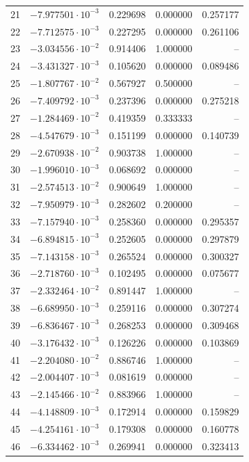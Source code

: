 \documentclass[11pt,reqno]{amsart}
\numberwithin{equation}{section}
\theoremstyle{plain}
\theoremstyle{definition}
\theoremstyle{remark}
\begin{document}
\begin{center}
\begin{longtable}{rrrrr}
21 & $-7.977501\cdot10^{-3}$ & 0.229698 & 0.000000 & 0.257177\\
22 & $-7.712575\cdot10^{-3}$ & 0.227295 & 0.000000 & 0.261106\\
23 & $-3.034556\cdot10^{-2}$ & 0.914406 & 1.000000 & --\\
24 & $-3.431327\cdot10^{-3}$ & 0.105620 & 0.000000 & 0.089486\\
25 & $-1.807767\cdot10^{-2}$ & 0.567927 & 0.500000 & --\\
26 & $-7.409792\cdot10^{-3}$ & 0.237396 & 0.000000 & 0.275218\\
27 & $-1.284469\cdot10^{-2}$ & 0.419359 & 0.333333 & --\\
28 & $-4.547679\cdot10^{-3}$ & 0.151199 & 0.000000 & 0.140739\\
29 & $-2.670938\cdot10^{-2}$ & 0.903738 & 1.000000 & --\\
30 & $-1.996010\cdot10^{-3}$ & 0.068692 & 0.000000 & --\\
31 & $-2.574513\cdot10^{-2}$ & 0.900649 & 1.000000 & --\\
32 & $-7.950979\cdot10^{-3}$ & 0.282602 & 0.200000 & --\\
33 & $-7.157940\cdot10^{-3}$ & 0.258360 & 0.000000 & 0.295357\\
34 & $-6.894815\cdot10^{-3}$ & 0.252605 & 0.000000 & 0.297879\\
35 & $-7.143158\cdot10^{-3}$ & 0.265524 & 0.000000 & 0.300327\\
36 & $-2.718760\cdot10^{-3}$ & 0.102495 & 0.000000 & 0.075677\\
37 & $-2.332464\cdot10^{-2}$ & 0.891447 & 1.000000 & --\\
38 & $-6.689950\cdot10^{-3}$ & 0.259116 & 0.000000 & 0.307274\\
39 & $-6.836467\cdot10^{-3}$ & 0.268253 & 0.000000 & 0.309468\\
40 & $-3.176432\cdot10^{-3}$ & 0.126226 & 0.000000 & 0.103869\\
41 & $-2.204080\cdot10^{-2}$ & 0.886746 & 1.000000 & --\\
42 & $-2.004407\cdot10^{-3}$ & 0.081619 & 0.000000 & --\\
43 & $-2.145466\cdot10^{-2}$ & 0.883966 & 1.000000 & --\\
44 & $-4.148809\cdot10^{-3}$ & 0.172914 & 0.000000 & 0.159829\\
45 & $-4.254161\cdot10^{-3}$ & 0.179308 & 0.000000 & 0.160778\\
46 & $-6.334462\cdot10^{-3}$ & 0.269941 & 0.000000 & 0.323413\\

\end{longtable}
\end{center}
\end{document}
